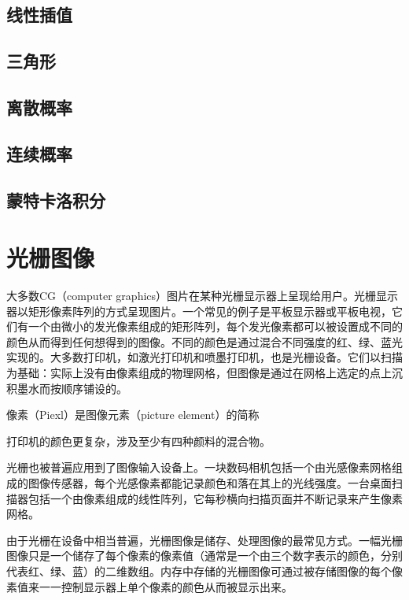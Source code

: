\documentclass[lang=cn,12pt]{elegantbook}
\begin{document}
\section{线性插值}

\section{三角形}

\section{离散概率}

\section{连续概率}

\section{蒙特卡洛积分}

\chapter{光栅图像}
 
大多数CG（computer graphics）图片在某种光栅显示器上呈现给用户。光栅显示器以矩形像素阵列的方式呈现图片。一个常见的例子是平板显示器或平板电视，它们有一个由微小的发光像素组成的矩形阵列，每个发光像素都可以被设置成不同的颜色从而得到任何想得到的图像。不同的颜色是通过混合不同强度的红、绿、蓝光实现的。大多数打印机，如激光打印机和喷墨打印机，也是光栅设备。它们以扫描为基础：实际上没有由像素组成的物理网格，但图像是通过在网格上选定的点上沉积墨水而按顺序铺设的。

\begin{note}
像素（Piexl）是图像元素（picture element）的简称
\end{note}

\begin{note}
打印机的颜色更复杂，涉及至少有四种颜料的混合物。
\end{note}

光栅也被普遍应用到了图像输入设备上。一块数码相机包括一个由光感像素网格组成的图像传感器，每个光感像素都能记录颜色和落在其上的光线强度。一台桌面扫描器包括一个由像素组成的线性阵列，它每秒横向扫描页面并不断记录来产生像素网格。

由于光栅在设备中相当普遍，光栅图像是储存、处理图像的最常见方式。一幅光栅图像只是一个储存了每个像素的像素值（通常是一个由三个数字表示的颜色，分别代表红、绿、蓝）的二维数组。内存中存储的光栅图像可通过被存储图像的每个像素值来一一控制显示器上单个像素的颜色从而被显示出来。
\end{document}
